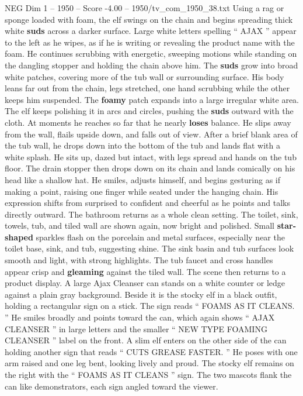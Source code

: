 \begin{textsample}{NEG Dim 1 – 1950 – Score -4.00 – 1950/tv\_com\_1950\_38.txt}
Using a rag or sponge loaded with foam, the elf swings on the chain and begins spreading thick white \textbf{suds} across a darker surface.
Large white letters spelling “ AJAX ” appear to the left as he wipes, as if he is writing or revealing the product name with the foam.
He continues scrubbing with energetic, sweeping motions while standing on the dangling stopper and holding the chain above him.
The \textbf{suds} grow into broad white patches, covering more of the tub wall or surrounding surface.
His body leans far out from the chain, legs stretched, one hand scrubbing while the other keeps him suspended.
The \textbf{foamy} patch expands into a large irregular white area.
The elf keeps polishing it in arcs and circles, pushing the \textbf{suds} outward with the cloth.
At moments he reaches so far that he nearly \textbf{loses} balance.
He slips away from the wall, flails upside down, and falls out of view.
After a brief blank area of the tub wall, he drops down into the bottom of the tub and lands flat with a white splash.
He sits up, dazed but intact, with legs spread and hands on the tub floor.
The drain stopper then drops down on its chain and lands comically on his head like a shallow hat.
He smiles, adjusts himself, and begins gesturing as if making a point, raising one finger while seated under the hanging chain.
His expression shifts from surprised to confident and cheerful as he points and talks directly outward.
The bathroom returns as a whole clean setting.
The toilet, sink, towels, tub, and tiled wall are shown again, now bright and polished.
Small \textbf{star-shaped} sparkles flash on the porcelain and metal surfaces, especially near the toilet base, sink, and tub, suggesting shine.
The sink basin and tub surfaces look smooth and light, with strong highlights.
The tub faucet and cross handles appear crisp and \textbf{gleaming} against the tiled wall.
The scene then returns to a product display.
A large Ajax Cleanser can stands on a white counter or ledge against a plain gray background.
Beside it is the stocky elf in a black outfit, holding a rectangular sign on a stick.
The sign reads “ FOAMS AS IT CLEANS. ” He smiles broadly and points toward the can, which again shows “ AJAX CLEANSER ” in large letters and the smaller “ NEW TYPE FOAMING CLEANSER ” label on the front.
A slim elf enters on the other side of the can holding another sign that reads “ CUTS GREASE FASTER. ” He poses with one arm raised and one leg bent, looking lively and proud.
The stocky elf remains on the right with the “ FOAMS AS IT CLEANS ” sign.
The two mascots flank the can like demonstrators, each sign angled toward the viewer.

\end{textsample}
